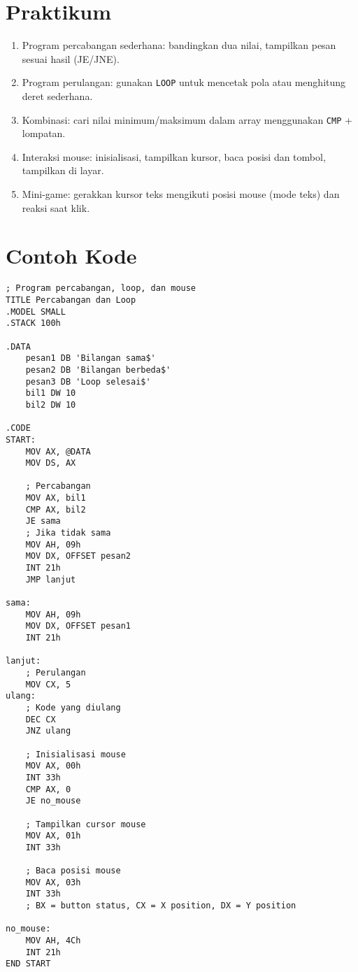 \section{Praktikum}
\begin{enumerate}
  \item Program percabangan sederhana: bandingkan dua nilai, tampilkan pesan sesuai hasil (JE/JNE).
  \item Program perulangan: gunakan \texttt{LOOP} untuk mencetak pola atau menghitung deret sederhana.
  \item Kombinasi: cari nilai minimum/maksimum dalam array menggunakan \texttt{CMP} + lompatan.
  \item Interaksi mouse: inisialisasi, tampilkan kursor, baca posisi dan tombol, tampilkan di layar.
  \item Mini-game: gerakkan kursor teks mengikuti posisi mouse (mode teks) dan reaksi saat klik.
\end{enumerate}

\section{Contoh Kode}
\begin{verbatim}
; Program percabangan, loop, dan mouse
TITLE Percabangan dan Loop
.MODEL SMALL
.STACK 100h

.DATA
    pesan1 DB 'Bilangan sama$'
    pesan2 DB 'Bilangan berbeda$'
    pesan3 DB 'Loop selesai$'
    bil1 DW 10
    bil2 DW 10

.CODE
START:
    MOV AX, @DATA
    MOV DS, AX
    
    ; Percabangan
    MOV AX, bil1
    CMP AX, bil2
    JE sama
    ; Jika tidak sama
    MOV AH, 09h
    MOV DX, OFFSET pesan2
    INT 21h
    JMP lanjut
    
sama:
    MOV AH, 09h
    MOV DX, OFFSET pesan1
    INT 21h
    
lanjut:
    ; Perulangan
    MOV CX, 5
ulang:
    ; Kode yang diulang
    DEC CX
    JNZ ulang
    
    ; Inisialisasi mouse
    MOV AX, 00h
    INT 33h
    CMP AX, 0
    JE no_mouse
    
    ; Tampilkan cursor mouse
    MOV AX, 01h
    INT 33h
    
    ; Baca posisi mouse
    MOV AX, 03h
    INT 33h
    ; BX = button status, CX = X position, DX = Y position
    
no_mouse:
    MOV AH, 4Ch
    INT 21h
END START
\end{verbatim}

